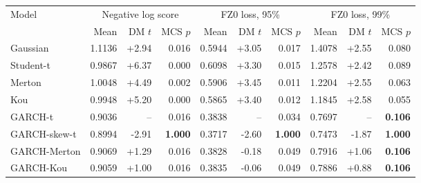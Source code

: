 \begin{tabular}{lrrrrrrrrr}
\toprule
Model & \multicolumn{3}{c}{Negative log score} & \multicolumn{3}{c}{FZ0 loss, 95\%} & \multicolumn{3}{c}{FZ0 loss, 99\%} \\\cmidrule(lr){2-4}\cmidrule(lr){5-7}\cmidrule(lr){8-10} & Mean & DM $t$ & MCS $p$ & Mean & DM $t$ & MCS $p$ & Mean & DM $t$ & MCS $p$ \\
\midrule
Gaussian & 1.1136 & +2.94 & 0.016 & 0.5944 & +3.05 & 0.017 & 1.4078 & +2.55 & 0.080 \\
Student-t & 0.9867 & +6.37 & 0.000 & 0.6098 & +3.30 & 0.015 & 1.2578 & +2.42 & 0.089 \\
Merton & 1.0048 & +4.49 & 0.002 & 0.5906 & +3.45 & 0.011 & 1.2204 & +2.55 & 0.063 \\
Kou & 0.9948 & +5.20 & 0.000 & 0.5865 & +3.40 & 0.012 & 1.1845 & +2.58 & 0.055 \\
GARCH-t & 0.9036 & -- & 0.016 & 0.3838 & -- & 0.034 & 0.7697 & -- & \textbf{0.106} \\
GARCH-skew-t & 0.8994 & -2.91 & \textbf{1.000} & 0.3717 & -2.60 & \textbf{1.000} & 0.7473 & -1.87 & \textbf{1.000} \\
GARCH-Merton & 0.9069 & +1.29 & 0.016 & 0.3828 & -0.18 & 0.049 & 0.7916 & +1.06 & \textbf{0.106} \\
GARCH-Kou & 0.9059 & +1.00 & 0.016 & 0.3835 & -0.06 & 0.049 & 0.7886 & +0.88 & \textbf{0.106} \\
\bottomrule
\end{tabular}
